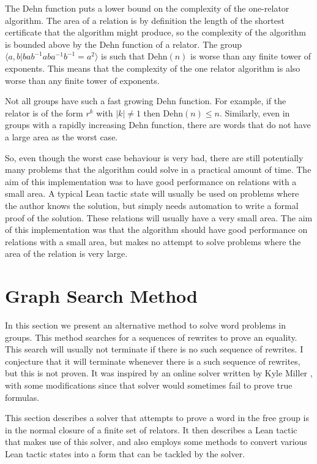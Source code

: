\documentclass[12pt]{article} %
\theoremstyle{definition}
\theoremstyle{definition}
\theoremstyle{definition}
\theoremstyle{definition}
\begin{document}
  The Dehn function puts a lower bound on the complexity of the one-relator algorithm.
  The area of a relation is by definition the length of the shortest certificate
  that the algorithm might produce, so the complexity of the algorithm is bounded above by
  the Dehn function of a relator.
  The group $\langle a, b | b a b^{-1} a b a^{-1} b^{-1} = a^2\rangle$ is such that
  $\text{Dehn}(n)$ is worse than any finite tower of exponents. This means that the
  complexity of the one relator algorithm is also worse than any finite tower of
  exponents.

  Not all groups have such a fast growing Dehn function. For example, if the relator
  is of the form $r^k$ with $|k| \ne 1$ then $\text{Dehn}(n) \le n$.
  Similarly, even in groups with a rapidly increasing Dehn function,
  there are words that do not have a large area as the worst case.

  So, even though the worst case behaviour is very bad, there are still potentially many
  problems that the algorithm could solve in a practical amount of time. The aim of this
  implementation was to have good performance on relations with a small area.
  A typical Lean tactic state will usually be used on problems where the author knows
  the solution, but simply needs automation to write a formal proof of the solution.
  These relations will usually have a very small area. The aim of this implementation
  was that the algorithm should have good performance on relations with a small area,
  but makes no attempt to solve problems where the area of the relation is very large.

\section{Graph Search Method}\label{gsmethod}

  In this section we present an alternative method to solve word problems in groups.
  This method searches for a sequences of rewrites to prove an equality. This search will
  usually not terminate if there is no such sequence of rewrites. I conjecture that it
  will terminate whenever there is a such sequence of rewrites, but this
  is not proven. It was inspired by an
  online solver written by Kyle Miller \cite{kylemiller}, with some modifications since that solver
  would sometimes fail to prove true formulas.

  This section describes a solver that attempts to prove a word in the free group
  is in the normal closure of a finite set of relators. It then describes
  a Lean tactic that makes use of this solver, and also employs some methods
  to convert various Lean tactic states into a form that can be tackled by
  the solver.
\end{document}
